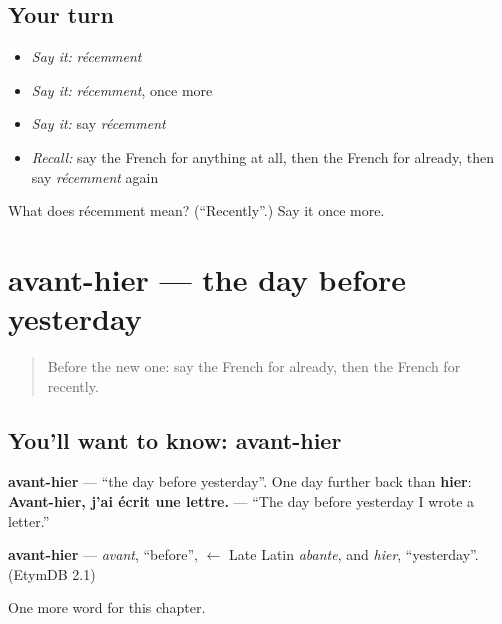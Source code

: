 \subsection*{Your turn}
\begin{itemize}
\raggedright
  \item \emph{Say it:} \emph{récemment}
  \item \emph{Say it:} \emph{récemment}, once more
  \item \emph{Say it:} say \emph{récemment}
  \item \emph{Recall:} say the French for anything at all, then the French for already, then say \emph{récemment} again
\end{itemize}

\begin{tcolorbox}[breakable,colback=teal!4,colframe=teal!35!black,title={Before you move on}]
What does récemment mean? (\textquotedblleft{}Recently\textquotedblright{}.) Say it once more.
\end{tcolorbox}
\section[avant-hier]{avant-hier — the day before yesterday}

\label{lesson:FR-C140-avant-hier}



\begin{quote}
Before the new one: say the French for already, then the French for recently.
\end{quote}

\subsection*{You'll want to know: avant-hier}
\textbf{avant-hier} — \textquotedblleft{}the day before yesterday\textquotedblright{}. One day further back than \textbf{hier}: \textbf{Avant-hier, j'ai écrit une lettre.} — \textquotedblleft{}The day before yesterday I wrote a letter.\textquotedblright{}

\begin{cousinweb}
\textbf{avant-hier} — \emph{avant}, \textquotedblleft{}before\textquotedblright{}, $\leftarrow$ Late Latin \emph{abante}, and \emph{hier}, \textquotedblleft{}yesterday\textquotedblright{}. (EtymDB 2.1)
\end{cousinweb}

\begin{grammarlens}[title={What you've built}]
One more word for this chapter.
\end{grammarlens}

